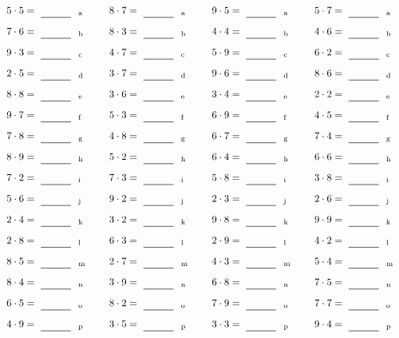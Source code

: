 \documentclass
[
  draft    = true,
  fontsize = 11pt,
  parskip  = half-
]
{scrartcl}
\begin{document}
\par\vfill\par
\begin{align*}
    \pline{5\cdot5}&=\rline{a}
  & \pline{8\cdot7}&=\rline{a}
  & \pline{9\cdot5}&=\rline{a}
  & \pline{5\cdot7}&=\rline{a} \\[1ex]
    \pline{7\cdot6}&=\rline{b}
  & \pline{8\cdot3}&=\rline{b}
  & \pline{4\cdot4}&=\rline{b}
  & \pline{4\cdot6}&=\rline{b} \\[1ex]
    \pline{9\cdot3}&=\rline{c}
  & \pline{4\cdot7}&=\rline{c}
  & \pline{5\cdot9}&=\rline{c}
  & \pline{6\cdot2}&=\rline{c} \\[1ex]
    \pline{2\cdot5}&=\rline{d}
  & \pline{3\cdot7}&=\rline{d}
  & \pline{9\cdot6}&=\rline{d}
  & \pline{8\cdot6}&=\rline{d} \\[1ex]
    \pline{8\cdot8}&=\rline{e}
  & \pline{3\cdot6}&=\rline{e}
  & \pline{3\cdot4}&=\rline{e}
  & \pline{2\cdot2}&=\rline{e} \\[1ex]
    \pline{9\cdot7}&=\rline{f}
  & \pline{5\cdot3}&=\rline{f}
  & \pline{6\cdot9}&=\rline{f}
  & \pline{4\cdot5}&=\rline{f} \\[1ex]
    \pline{7\cdot8}&=\rline{g}
  & \pline{4\cdot8}&=\rline{g}
  & \pline{6\cdot7}&=\rline{g}
  & \pline{7\cdot4}&=\rline{g} \\[1ex]
    \pline{8\cdot9}&=\rline{h}
  & \pline{5\cdot2}&=\rline{h}
  & \pline{6\cdot4}&=\rline{h}
  & \pline{6\cdot6}&=\rline{h} \\[1ex]
    \pline{7\cdot2}&=\rline{i}
  & \pline{7\cdot3}&=\rline{i}
  & \pline{5\cdot8}&=\rline{i}
  & \pline{3\cdot8}&=\rline{i} \\[1ex]
    \pline{5\cdot6}&=\rline{j}
  & \pline{9\cdot2}&=\rline{j}
  & \pline{2\cdot3}&=\rline{j}
  & \pline{2\cdot6}&=\rline{j} \\[1ex]
    \pline{2\cdot4}&=\rline{k}
  & \pline{3\cdot2}&=\rline{k}
  & \pline{9\cdot8}&=\rline{k}
  & \pline{9\cdot9}&=\rline{k} \\[1ex]
    \pline{2\cdot8}&=\rline{l}
  & \pline{6\cdot3}&=\rline{l}
  & \pline{2\cdot9}&=\rline{l}
  & \pline{4\cdot2}&=\rline{l} \\[1ex]
    \pline{8\cdot5}&=\rline{m}
  & \pline{2\cdot7}&=\rline{m}
  & \pline{4\cdot3}&=\rline{m}
  & \pline{5\cdot4}&=\rline{m} \\[1ex]
    \pline{8\cdot4}&=\rline{n}
  & \pline{3\cdot9}&=\rline{n}
  & \pline{6\cdot8}&=\rline{n}
  & \pline{7\cdot5}&=\rline{n} \\[1ex]
    \pline{6\cdot5}&=\rline{o}
  & \pline{8\cdot2}&=\rline{o}
  & \pline{7\cdot9}&=\rline{o}
  & \pline{7\cdot7}&=\rline{o} \\[1ex]
    \pline{4\cdot9}&=\rline{p}
  & \pline{3\cdot5}&=\rline{p}
  & \pline{3\cdot3}&=\rline{p}
  & \pline{9\cdot4}&=\rline{p}
\end{align*}
\end{document}

